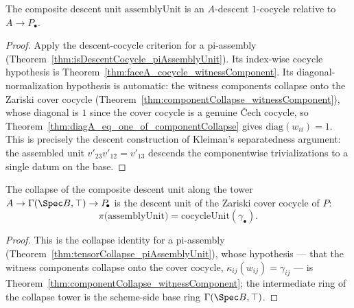 \begin{theorem}
  \label{thm:isDescentCocycle_assemblyUnit}
  \leanok
  The composite descent unit \(\mathrm{assemblyUnit}\) is an \(A\)-descent \(1\)-cocycle
  relative to \(A \to P_{\!\bullet}\).
\end{theorem}
\begin{proof}
  \leanok
  Apply the descent-cocycle criterion for a pi-assembly
  (Theorem~\ref{thm:isDescentCocycle_piAssemblyUnit}). Its index-wise cocycle hypothesis is
  Theorem~\ref{thm:faceA_cocycle_witnessComponent}. Its diagonal-normalization hypothesis is
  automatic: the witness components collapse onto the Zariski cover cocycle
  (Theorem~\ref{thm:componentCollapse_witnessComponent}), whose diagonal is \(1\) since the
  cover cocycle is a genuine \v Cech cocycle, so
  Theorem~\ref{thm:diagA_eq_one_of_componentCollapse} gives \(\mathrm{diag}(w_{ii}) = 1\). This
  is precisely the descent construction of Kleiman's separatedness argument: the assembled unit
  \(v'_{23} v'_{12} = v'_{13}\) descends the componentwise trivializations to a single datum on
  the base.
\end{proof}

\begin{theorem}
  \label{thm:tensorCollapse_assemblyUnit}
  \leanok
  The collapse of the composite descent unit along the tower \(A \to \Gamma(\Spec B, \top) \to
  P_{\!\bullet}\) is the descent unit of the Zariski cover cocycle of \(P\):
  \[
    \pi\bigl(\mathrm{assemblyUnit}\bigr) = \mathrm{cocycleUnit}(\gamma_{\bullet}) .
  \]
\end{theorem}
\begin{proof}
  \leanok
  This is the collapse identity for a pi-assembly
  (Theorem~\ref{thm:tensorCollapse_piAssemblyUnit}), whose hypothesis — that the witness
  components collapse onto the cover cocycle, \(\kappa_{ij}(w_{ij}) = \gamma_{ij}\) — is
  Theorem~\ref{thm:componentCollapse_witnessComponent}; the intermediate ring of the collapse
  tower is the scheme-side base ring \(\Gamma(\Spec B, \top)\).
\end{proof}

